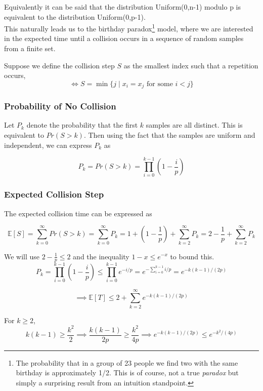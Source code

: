 \noindent Equivalently it can be said that the distribution Uniform(0,n-1) modulo p is equivalent to the
distribution Uniform(0,p-1).\\

\noindent This naturally leads us to the birthday paradox\footnote{The probability that in a group of 23 people we find two with 
the same birthday is approximately 1/2. This is of course, not a true \emph{paradox} but simply a 
surprising result from an intuition standpoint.} model, where we are 
interested in the expected time until a collision occurs in a sequence of random samples from a finite set.

Suppose we define the collision step \(S\) as the smallest 
index such that a repetition occurs, 
\[
\iff S = \min\{j \mid x_i = x_j \text{ for some } i<j\}
\]

\subsubsection{Probability of No Collision}

Let \(P_k\) denote the probability that the first \(k\) samples are all distinct. 
This is equivalent to \(Pr(S > k)\). Then using the fact that the samples 
are uniform and independent, we can express \(P_k\) as

\[
P_k
= Pr(S > k) =
\prod_{i=0}^{k-1}\left(1-\frac{i}{p}\right)
\]


\subsubsection{Expected Collision Step}

The expected collision time can be expressed as

\[
\mathbb{E}[S]
=
\sum_{k=0}^{\infty}Pr(S>k)
=
\sum_{k=0}^{\infty} P_k
=
1+\left(1-\frac1p\right)+\sum_{k=2}^{\infty}P_k
=
2-\frac1p + \sum_{k=2}^{\infty}P_k
\]

\vspace{1em}
We will use $2-\frac1p \le 2$ and the inequality \(1-x\le e^{-x}\) to bound this.
\[
P_k
=
\prod_{i=0}^{k-1}\left(1-\frac{i}{p}\right)
\le
\prod_{i=0}^{k-1}e^{-i/p}
=
e^{-\sum_{i=0}^{k-1} i/p}
=
e^{-k(k-1)/(2p)}
\]


\[
\implies
\mathbb{E}[T]
\le
2
+
\sum_{k=2}^{\infty}
e^{-k(k-1)/(2p)}
\]

\vspace{1em}
For \(k\ge2\),
\[
k(k-1)\ge \frac{k^2}{2}
\implies 
\frac{k(k-1)}{2p}
\ge
\frac{k^2}{4p}
\implies
e^{-k(k-1)/(2p)}
\le
e^{-k^2/(4p)}
\]


